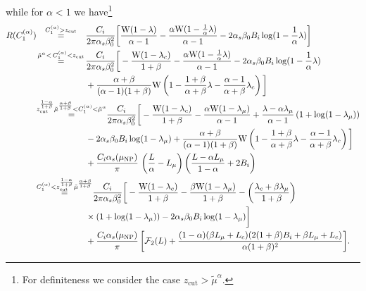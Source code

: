 \documentclass[letterpaper,11pt]{article}
\newcommand{\xlog}{{\rm W}}
\newcommand{\wideeq}[1]{\makebox[{#1}]{$=$}}
\newcommand{\as}{\alpha_s}
\newcommand{\C}[2]{C^{(#2)}_{#1}}
\newcommand{\zcut}{z_\text{cut}}
\newcommand{\ea}{{\C{1}{\alpha}}}
\begin{document}
while for $\alpha<1$ we have\footnote{For definiteness we consider the case $\zcut>\tilde{\mu}^\alpha$.}
%
 \begin{align}\label{full-rad-ang-beta-pos-alpha-lt-1}
R(\ea) 
%
& \overset{\ea>\zcut}{\wideeq{2.0cm}}  \frac{C_i}{2\pi \alpha_s \beta_0^2} \bigg[
    \frac{\xlog(1-\lambda)}{\alpha-1}
     -\frac{\alpha \xlog(1-\frac{1}{\alpha}\lambda)}{\alpha-1}  
     -2 \alpha_s \beta_0 B_i \log(1-\frac{1}{\alpha}\lambda)\bigg]\\
& \overset{\tilde{\mu}^\alpha< \, \ea<\zcut}{\wideeq{2.0cm}}  \frac{C_i}{2\pi \alpha_s \beta_0^2} \bigg[
 -\frac{\xlog(1-\lambda_c)}{1+\beta}
     -\frac{\alpha \xlog(1-\frac{1}{\alpha}\lambda)}{\alpha-1}  
     -2 \alpha_s \beta_0 B_i \log(1-\frac{1}{\alpha}\lambda)\notag \\& \phantom{\wideeq{2.0cm}}+
     \frac{\alpha+\beta}{(\alpha-1)(1+\beta)} \xlog\left(1-\frac{1+\beta}{\alpha+\beta}\lambda-\frac{\alpha-1}{\alpha+\beta}\lambda_c\right)
     \bigg]
\\
& \overset{\zcut^\frac{1-\alpha}{1+\beta}\tilde{\mu}^\frac{\alpha+\beta}{1+\beta}<\ea<\tilde{\mu}^\alpha}{\wideeq{2.0cm}} \frac{C_i}{2\pi \alpha_s \beta_0^2} \bigg[ 
-\frac{\xlog(1-\lambda_c)}{1+\beta}
     -\frac{\alpha \xlog(1-\lambda_\mu)}{\alpha-1}  +
   \frac{\lambda-\alpha \lambda_\mu}{\alpha-1}\left(1+\log(1-\lambda_\mu) \right)
    \notag \\& \phantom{\wideeq{2.0cm}} -2 \alpha_s \beta_0 B_i \log(1-\lambda_\mu)+\frac{\alpha+\beta}{(\alpha-1)(1+\beta)} \xlog\left(1-\frac{1+\beta}{\alpha+\beta}\lambda-\frac{\alpha-1}{\alpha+\beta}\lambda_c\right)
 \bigg] \notag \\& \phantom{\wideeq{2.0cm}}+
  \frac{C_i \as(\mu_\text{NP})}{\pi} \,  \left(\frac{L}{\alpha}- L_\mu\right)\left(\frac{L-\alpha L_\mu}{1-\alpha}+2B_i\right)
  \\
& \overset{\ea<\zcut^\frac{1-\alpha}{1+\beta}\tilde{\mu}^\frac{\alpha+\beta}{1+\beta}}{\wideeq{2.0cm}} \frac{C_i}{2\pi \alpha_s \beta_0^2} \bigg[ 
-\frac{\xlog(1-\lambda_c)}{1+\beta}
     -\frac{\beta \xlog(1-\lambda_\mu)}{1+\beta}  -
 \left(\frac{\lambda_c+\beta \lambda_\mu}{1+\beta} \right)
   \notag \\& \phantom{\wideeq{2.0cm}} \times
 \left(1+\log(1-\lambda_\mu) \right)-2 \alpha_s \beta_0 B_i \log(1-\lambda_\mu)
 \bigg] \notag \\& \phantom{\wideeq{2.0cm}}
 + \frac{C_i \as(\mu_\text{NP})}{\pi} \, \bigg[\mathcal{F}_2(L)
 +\frac{(1-\alpha) (\beta L_\mu+L_c) (2 (1+\beta) B_i+\beta L_\mu+L_c)}{\alpha (1+\beta)^2}
  \bigg].
 \end{align}
\end{document}
